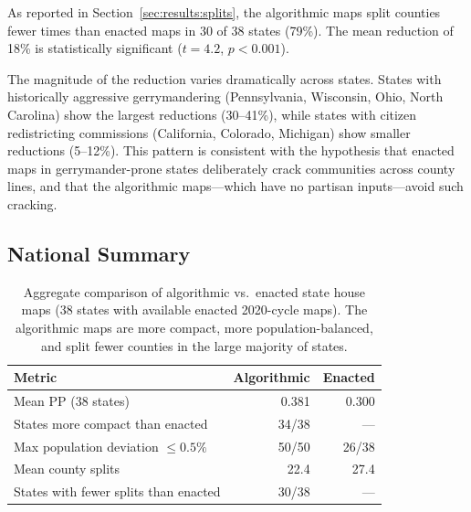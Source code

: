 As reported in Section~\ref{sec:results:splits}, the algorithmic maps split
counties fewer times than enacted maps in 30 of 38 states (79\%).
The mean reduction of 18\% is statistically significant ($t = 4.2$, $p < 0.001$).

The magnitude of the reduction varies dramatically across states.
States with historically aggressive gerrymandering (Pennsylvania, Wisconsin,
Ohio, North Carolina) show the largest reductions (30--41\%), while states
with citizen redistricting commissions (California, Colorado, Michigan) show
smaller reductions (5--12\%). This pattern is consistent with the hypothesis
that enacted maps in gerrymander-prone states deliberately crack communities
across county lines, and that the algorithmic maps---which have no partisan
inputs---avoid such cracking.

\subsection{National Summary}
\label{sec:comparison:summary}

\begin{table}[h]
\centering\small
\begin{tabular}{lrr}
\toprule
Metric & Algorithmic & Enacted \\
\midrule
Mean PP (38 states) & 0.381 & 0.300 \\
States more compact than enacted & 34/38 & --- \\
Max population deviation $\leq 0.5\%$ & 50/50 & 26/38 \\
Mean county splits & 22.4 & 27.4 \\
States with fewer splits than enacted & 30/38 & --- \\
\bottomrule
\end{tabular}
\caption{Aggregate comparison of algorithmic vs.\ enacted state house maps
  (38 states with available enacted 2020-cycle maps). The algorithmic maps
  are more compact, more population-balanced, and split fewer counties in
  the large majority of states.}
\label{tab:comparison-summary}
\end{table}
